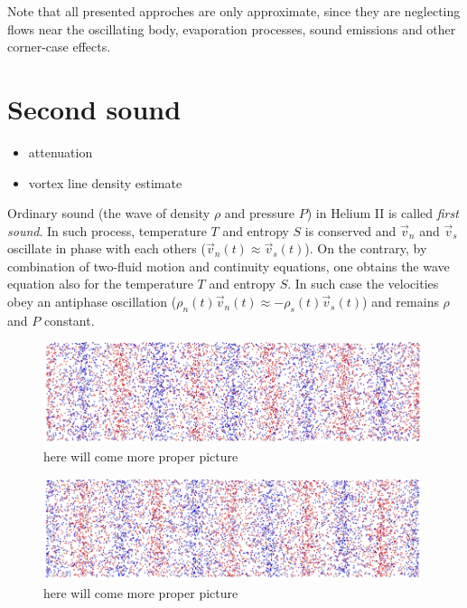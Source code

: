 Note that all presented approches are only approximate, since they are neglecting flows near the oscillating body, evaporation processes, sound emissions and other corner-case effects.

\section{Second sound}
\begin{itemize}
	\item attenuation
	\item vortex line density estimate
\end{itemize}

Ordinary sound (the wave of density $\rho$ and pressure $P$) in Helium II is called \textit{first sound}. In such process, temperature $T$ and entropy $S$ is conserved and $\vec{v}_n$ and $\vec{v}_s$ oscillate in phase with each others ($\vec{v}_n(t) \approx \vec{v}_s(t)$). On the contrary, by combination of two-fluid motion and continuity equations, one obtains the wave equation also for the temperature $T$ and entropy $S$. In such case the velocities obey an antiphase oscillation ($\rho_n(t) \vec{v}_n(t) \approx - \rho_s(t) \vec{v}_s(t)$) and remains $\rho$ and $P$ constant.

\begin{figure}[h]
	\centering
	\includegraphics[width=0.99\textwidth]{graphics/theory/ss_1}
	\caption{here will come more proper picture}
	\label{ss_1}
\end{figure}

\begin{figure}[h]
	\centering
	\includegraphics[width=0.99\textwidth]{graphics/theory/ss_2}
	\caption{here will come more proper picture}
	\label{ss_2}
\end{figure}

